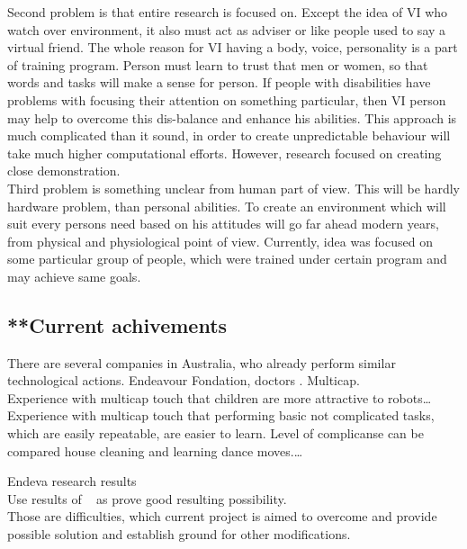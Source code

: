 \documentclass[18pt]{article}
\numberwithin{equation}{section} %
\numberwithin{figure}{section} %
\numberwithin{table}{section} %
\begin{document}
	Second problem is that entire research is focused on. Except the idea of VI who watch over environment, it also must act as adviser or like people used to say a virtual friend. The whole reason for VI having a body, voice, personality is a part of training program. Person must learn to trust that men or women, so that words and tasks will make a sense for person. If people with disabilities have problems with focusing their attention on something particular, then VI person may help to overcome this dis-balance and enhance his abilities. This approach is much complicated than it sound, in order to create unpredictable behaviour will take much higher computational efforts. However, research focused on creating close demonstration.\\
	
	Third problem is something unclear from human part of view. This will be hardly hardware problem, than personal abilities. To create an environment which will suit every persons need based on his attitudes will go far ahead modern years, from physical and physiological point of view. Currently, idea was focused on some particular group of people, which were trained under certain program and may achieve same goals. \\
	
	\subsection{**Current achivements}		
	There are several companies in Australia, who already perform similar technological actions. Endeavour Fondation, doctors . Multicap. \\
	
	Experience with multicap touch that children are more attractive to robots\ldots
	Experience with multicap touch that performing basic not complicated tasks, which are easily repeatable, are easier to learn. Level of complicanse can be compared house cleaning and learning dance moves.\ldots	
	
	Endeva research results \\
	
	Use results of ~\cite{LOTAN2009229} as prove good resulting possibility. \\
	
	Those are difficulties, which current project is aimed to overcome and provide possible solution and establish ground for other modifications. \\ \\
	
\end{document}

